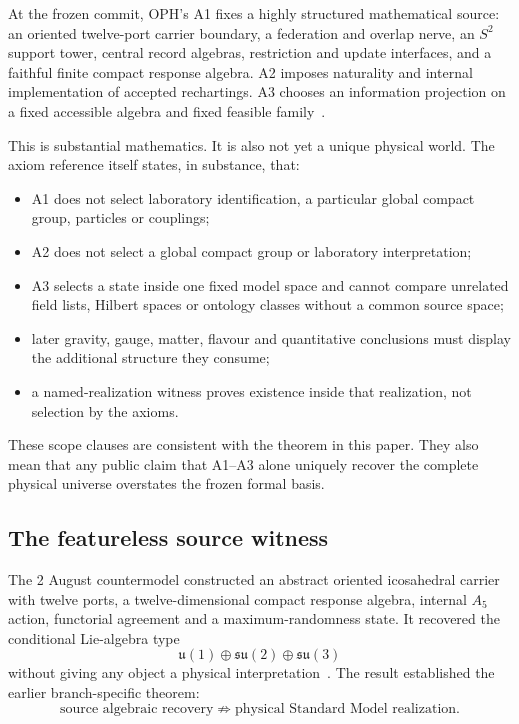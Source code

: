 \documentclass[10pt,a4paper]{article}
\theoremstyle{definition}
\theoremstyle{remark}
\begin{document}
At the frozen commit, OPH's A1 fixes a highly structured mathematical source:
an oriented twelve-port carrier boundary, a federation and overlap nerve, an
\(S^2\) support tower, central record algebras, restriction and update
interfaces, and a faithful finite compact response algebra.  A2 imposes
naturality and internal implementation of accepted rechartings.  A3 chooses an
information projection on a fixed accessible algebra and fixed feasible
family~\cite{OPHAxiomReference}.

This is substantial mathematics.  It is also not yet a unique physical world.
The axiom reference itself states, in substance, that:

\begin{itemize}
\item A1 does not select laboratory identification, a particular global
compact group, particles or couplings;
\item A2 does not select a global compact group or laboratory interpretation;
\item A3 selects a state inside one fixed model space and cannot compare
unrelated field lists, Hilbert spaces or ontology classes without a common
source space;
\item later gravity, gauge, matter, flavour and quantitative conclusions must
display the additional structure they consume;
\item a named-realization witness proves existence inside that realization,
not selection by the axioms.
\end{itemize}

These scope clauses are consistent with the theorem in this paper.  They also
mean that any public claim that A1--A3 alone uniquely recover the complete
physical universe overstates the frozen formal basis.

\subsection{The featureless source witness}

The 2 August countermodel constructed an abstract oriented icosahedral carrier
with twelve ports, a twelve-dimensional compact response algebra, internal
\(A_5\) action, functorial agreement and a maximum-randomness state.  It
recovered the conditional Lie-algebra type
\[
\mathfrak u(1)\oplus\mathfrak{su}(2)\oplus\mathfrak{su}(3)
\]
without giving any object a physical interpretation~\cite{AnonFeatureless}.
The result established the earlier branch-specific theorem:
\[
\text{source algebraic recovery}
\not\Longrightarrow
\text{physical Standard Model realization}.
\]
\end{document}
